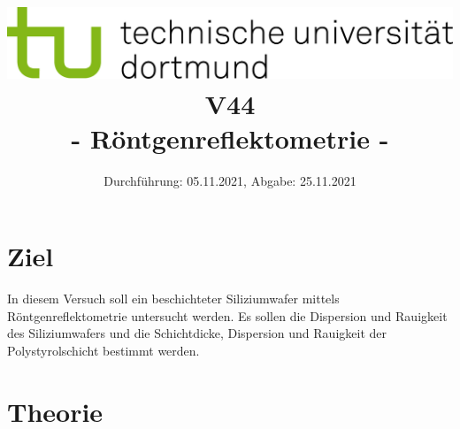 
\usepackage{romannum}
\usepackage{listings}
\lstset{numbers=left, numberstyle=\tiny, numbersep=5pt}
\lstset{language=Perl}

\title{\includegraphics[scale=0.8]{../logo.jpg} \\ \vspace*{1cm} V44 \\ - Röntgenreflektometrie -}

\date{Durchführung: 05.11.2021, Abgabe: 25.11.2021}



\maketitle

\tableofcontents
\newpage

\section{Ziel}
In diesem Versuch soll ein beschichteter Siliziumwafer mittels Röntgenreflektometrie untersucht werden. 
Es sollen die Dispersion und Rauigkeit des Siliziumwafers und die Schichtdicke, 
Dispersion und Rauigkeit der Polystyrolschicht bestimmt werden.

\section{Theorie}
\label{sec:theorie}

